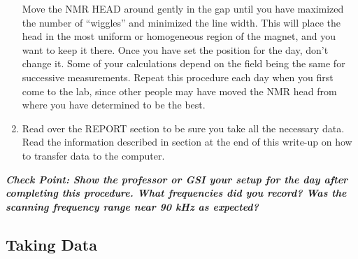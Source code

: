 \documentclass{../lab}
\begin{document}
\begin{enumerate}
    Move the NMR HEAD around gently in the gap until you have maximized the number of ``wiggles'' and minimized the line width. This will place the head in the most uniform or homogeneous region of the magnet, and you want to keep it there. Once you have set the position for the day, don't change it. Some of your calculations depend on the field being the same for successive measurements. Repeat this procedure each day when you first come to the lab, since other people may have moved the NMR head from where you have determined to be the best.

    \item Read over the REPORT section to be sure you take all the necessary data. Read the information described in section at the end of this write-up on how to transfer data to the computer.
\end{enumerate}

\emph{\textbf{Check Point: Show the professor or GSI your setup for the day after completing this procedure. What frequencies did you record? Was the scanning frequency range near 90 kHz as expected?}}

\subsection{Taking Data}
\end{document}
